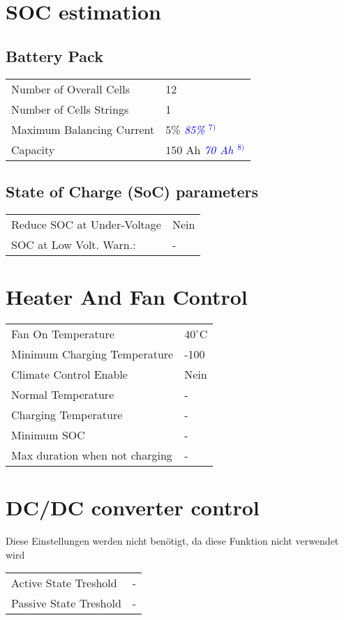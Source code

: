 \section*{SOC estimation}
\subsection*{Battery Pack}
\begin{tabular}{p{11cm}p{3cm}}
	Number of Overall Cells & 12 \\
	Number of Cells Strings & 1 \\
	Maximum Balancing Current & $5$\% \textcolor{blue}{\textit{85\% $^{7)}$}} \\
	Capacity & $150$ Ah \textcolor{blue}{\textit{70 Ah $^{8)}$}}
\end{tabular}

\subsection*{State of Charge (SoC) parameters}
\begin{tabular}{p{11cm}p{2cm}}
	Reduce SOC at Under-Voltage & Nein \\
	SOC at Low Volt. Warn.: & -
\end{tabular}

\section*{Heater And Fan Control}
\begin{tabular}{p{11cm}p{2cm}}
	Fan On Temperature & $40^\circ$C \\
	Minimum Charging Temperature & -100 \\
	Climate Control Enable & Nein \\
	Normal Temperature & - \\
	Charging Temperature & - \\
	Minimum SOC & - \\
	Max duration when not charging & -
\end{tabular}

\section*{DC/DC converter control}
Diese Einstellungen werden nicht benötigt, da diese Funktion nicht verwendet wird \\
\begin{tabular}{p{11cm}p{2cm}}
	Active State Treshold & - \\
	Passive State Treshold & -
\end{tabular}


